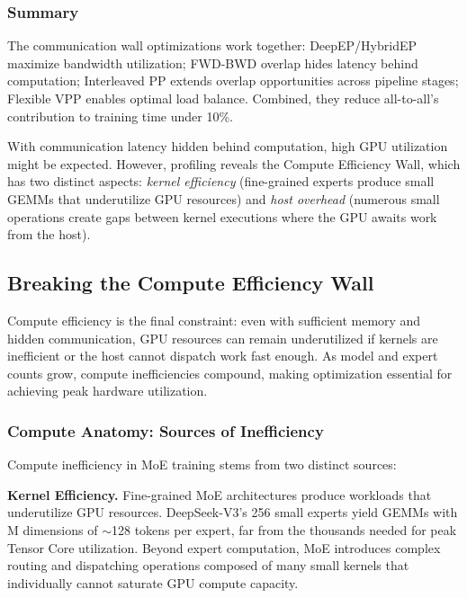 
\subsubsection{Summary}
The communication wall optimizations work together: DeepEP/HybridEP maximize bandwidth utilization; FWD-BWD overlap hides latency behind computation; Interleaved PP extends overlap opportunities across pipeline stages; Flexible VPP enables optimal load balance. Combined, they reduce all-to-all's contribution to training time under 10\%.

With communication latency hidden behind computation, high GPU utilization might be expected. However, profiling reveals the Compute Efficiency Wall, which has two distinct aspects: \textit{kernel efficiency} (fine-grained experts produce small GEMMs that underutilize GPU resources) and \textit{host overhead} (numerous small operations create gaps between kernel executions where the GPU awaits work from the host).

\subsection{Breaking the Compute Efficiency Wall}\label{sec:compute-wall}

Compute efficiency is the final constraint: even with sufficient memory and hidden communication, GPU resources can remain underutilized if kernels are inefficient or the host cannot dispatch work fast enough. As model and expert counts grow, compute inefficiencies compound, making optimization essential for achieving peak hardware utilization.

\subsubsection{Compute Anatomy: Sources of Inefficiency}

Compute inefficiency in MoE training stems from two distinct sources:

\textbf{Kernel Efficiency.} Fine-grained MoE architectures produce workloads that underutilize GPU resources. DeepSeek-V3's 256 small experts yield GEMMs with M dimensions of $\sim$128 tokens per expert, far from the thousands needed for peak Tensor Core utilization. Beyond expert computation, MoE introduces complex routing and dispatching operations composed of many small kernels that individually cannot saturate GPU compute capacity.

